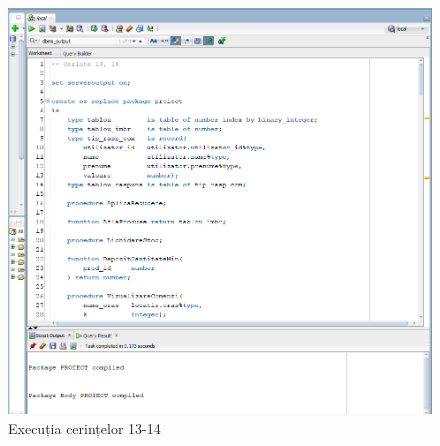 \documentclass[12pt]{article}
\begin{document}
\begin{figure}[htp]
\centering
\includegraphics[width=1\linewidth]{Cerinta13-14.png}
\caption{Execuția cerințelor 13-14}
\end{figure}



\end{document}
